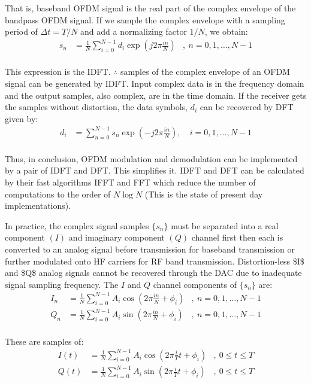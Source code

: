 That is, baseband \gls{OFDM} signal is the real part of the complex envelope of the bandpass \gls{OFDM} signal. If we sample the complex envelope with a sampling period of $\Delta t = T/N$ and add a normalizing factor $1/N$, we obtain:
\begin{align*}
s_n &= \frac{1}{N}\sum_{i=0}^{N-1}d_i\exp\left( j2\pi\frac{in}{N}\right)&,\ n = 0,1,\ldots,N-1\\
\end{align*}

This expression is the \gls{IDFT}. $\therefore$ samples of the complex envelope of an OFDM signal can be generated by \gls{IDFT}\cite{fuqin}. Input complex data is in the frequency domain and the output samples, also complex, are in the time domain. If the receiver gets the samples without distortion, the data symbols, $d_i$ can be recovered by \gls{DFT}\cite{ofdm_intro} given by:
\begin{align*}
d_i &= \sum_{n=0}^{N-1}s_n\exp\left( -j2\pi\frac{in}{N}\right),&\ i=0,1,\ldots,N-1\\
\end{align*}

Thus, in conclusion, \gls{OFDM} modulation and demodulation can be implemented by a pair of \gls{IDFT} and \gls{DFT}. This simplifies it. \gls{IDFT} and \gls{DFT} can be calculated by their fast algorithms \gls{IFFT} and \gls{FFT} which reduce the number of computations to the order of $N\log N$\cite{ofdm_intro} (This is the state of present day implementations).

In practice, the complex signal samples $\{s_n\}$ must be separated into a real component $(I)$ and imaginary component $(Q)$ channel first then each is converted to an analog signal before transmission for baseband transmission or further modulated onto \gls{HF} carriers for \gls{RF} band transmission. Distortion-less \gls{$I$} and \gls{$Q$} analog signals cannot be recovered through the \gls{DAC} due to inadequate signal sampling frequency. The $I$ and $Q$ channel components of $\{ s_n\}$ are:
\begin{align*}
I_n &= \frac{1}{N}\sum_{i=0}^{N-1}A_i\cos\left( 2\pi\frac{in}{N}+\phi_i\right)&,\ n=0,1,\ldots,N-1\\
Q_n &= \frac{1}{N}\sum_{i=0}^{N-1}A_i\sin\left( 2\pi\frac{in}{N}+\phi_i\right)&,\ n=0,1,\ldots,N-1\\
\end{align*}

\noindent These are samples of:
\begin{align*}
I(t) &= \frac{1}{N}\sum_{i=0}^{N-1}A_i\cos\left( 2\pi\frac{i}{T}t+\phi_i\right)&,\ 0\leq t\leq T\\
Q(t) &= \frac{1}{N}\sum_{i=0}^{N-1}A_i\sin\left( 2\pi\frac{i}{T}t+\phi_i\right)&,\ 0\leq t\leq T\\
\end{align*}

